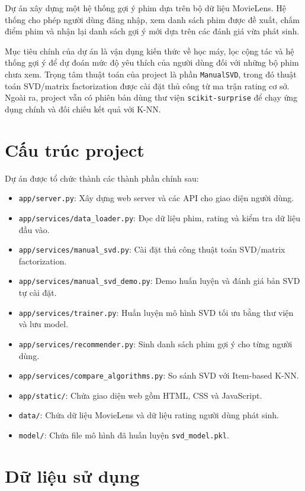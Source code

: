 \documentclass[12pt,a4paper]{article}
\begin{document}
Dự án xây dựng một hệ thống gợi ý phim dựa trên bộ dữ liệu MovieLens. Hệ thống cho phép người dùng đăng nhập, xem danh sách phim được đề xuất, chấm điểm phim và nhận lại danh sách gợi ý mới dựa trên các đánh giá vừa phát sinh.

Mục tiêu chính của dự án là vận dụng kiến thức về học máy, lọc cộng tác và hệ thống gợi ý để dự đoán mức độ yêu thích của người dùng đối với những bộ phim chưa xem. Trọng tâm thuật toán của project là phần \texttt{ManualSVD}, trong đó thuật toán SVD/matrix factorization được cài đặt thủ công từ ma trận rating cơ sở. Ngoài ra, project vẫn có phiên bản dùng thư viện \texttt{scikit-surprise} để chạy ứng dụng chính và đối chiếu kết quả với K-NN.

\section{Cấu trúc project}

Dự án được tổ chức thành các thành phần chính sau:

\begin{itemize}
    \item \texttt{app/server.py}: Xây dựng web server và các API cho giao diện người dùng.
    \item \texttt{app/services/data\_loader.py}: Đọc dữ liệu phim, rating và kiểm tra dữ liệu đầu vào.
    \item \texttt{app/services/manual\_svd.py}: Cài đặt thủ công thuật toán SVD/matrix factorization.
    \item \texttt{app/services/manual\_svd\_demo.py}: Demo huấn luyện và đánh giá bản SVD tự cài đặt.
    \item \texttt{app/services/trainer.py}: Huấn luyện mô hình SVD tối ưu bằng thư viện và lưu model.
    \item \texttt{app/services/recommender.py}: Sinh danh sách phim gợi ý cho từng người dùng.
    \item \texttt{app/services/compare\_algorithms.py}: So sánh SVD với Item-based K-NN.
    \item \texttt{app/static/}: Chứa giao diện web gồm HTML, CSS và JavaScript.
    \item \texttt{data/}: Chứa dữ liệu MovieLens và dữ liệu rating người dùng phát sinh.
    \item \texttt{model/}: Chứa file mô hình đã huấn luyện \texttt{svd\_model.pkl}.
\end{itemize}

\section{Dữ liệu sử dụng}
\end{document}
